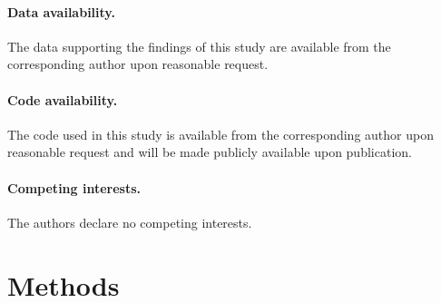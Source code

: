 \documentclass[twocolumn,10pt]{article}
\begin{document}


\paragraph*{Data availability.}
The data supporting the findings of this study are available from the corresponding author upon reasonable request.

\paragraph*{Code availability.}
The code used in this study is available from the corresponding author upon reasonable request and will be made publicly available upon publication.

\paragraph*{Competing interests.}
The authors declare no competing interests.




\section*{Methods}


\end{document}
